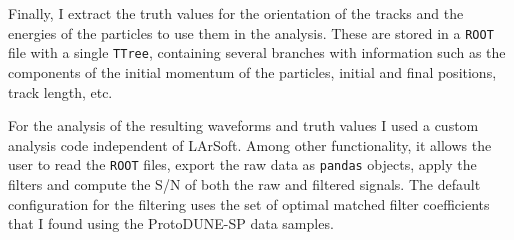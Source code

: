 Finally, I extract the truth values for the orientation of the tracks and the energies of the particles to use them in the analysis. These are stored in a \texttt{ROOT} file with a single \texttt{TTree}, containing several branches with information such as the components of the initial momentum of the particles, initial and final positions, track length, etc.

For the analysis of the resulting waveforms and truth values I used a custom analysis code independent of LArSoft. Among other functionality, it allows the user to read the \texttt{ROOT} files, export the raw data as \texttt{pandas} objects, apply the filters and compute the S/N of both the raw and filtered signals. The default configuration for the filtering uses the set of optimal matched filter coefficients that I found using the ProtoDUNE-SP data samples.

